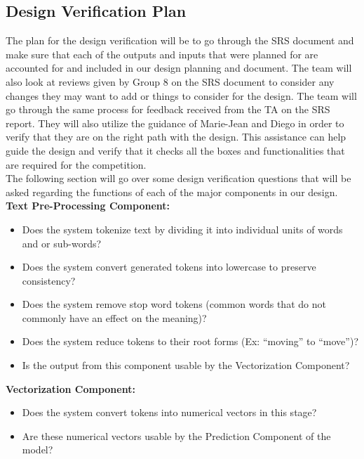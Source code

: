 \documentclass[12pt, titlepage]{article}
\begin{document}
  
  \subsection{Design Verification Plan} \label{Design Verification Plan}
  
  The plan for the design verification will be to go through the SRS document and make sure that each of the outputs and inputs that were planned for are accounted for and included in our design planning and document. The team will also look at reviews given by Group 8 on the SRS document to consider any changes they may want to add or things to consider for the design. The team will go through the same process for feedback received from the TA on the SRS report. They will also utilize the guidance of Marie-Jean and Diego in order to verify that they are on the right path with the design. This assistance can help guide the design and verify that it checks all the boxes and functionalities that are required for the competition. \\

  The following section will go over some design verification questions that will be asked regarding the functions of each of the major components in our design.\\
  
  \noindent \textbf{Text Pre-Processing Component:}
  \begin{itemize}
  \item Does the system tokenize text by dividing it into individual units of words and or sub-words?
  \item Does the system convert generated tokens into lowercase to preserve consistency?
  \item Does the system remove stop word tokens (common words that do not commonly have an effect on the meaning)?
  \item Does the system reduce tokens to their root forms (Ex: “moving” to “move”)?
  \item Is the output from this component usable by the Vectorization Component?\\
  \end{itemize}
  
  
  
  \noindent \textbf{Vectorization Component:}
  \begin{itemize}
  \item Does the system convert tokens into numerical vectors in this stage?
  \item Are these numerical vectors usable by the Prediction Component of the model?\\
  \end{itemize}
  
\end{document}
